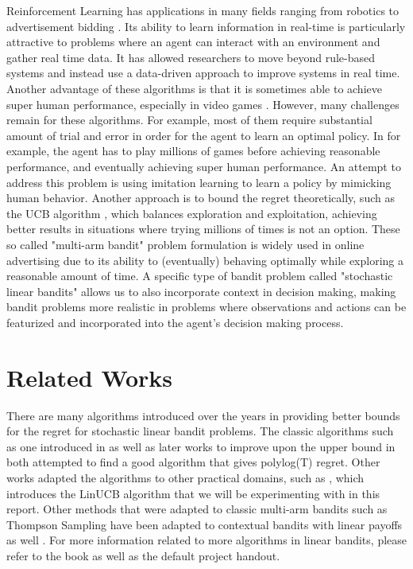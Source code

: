 \documentclass{article}
\begin{document}
Reinforcement Learning has applications in many fields ranging from robotics \cite{peters2003reinforcement} to advertisement bidding \cite{cai2017real}. Its ability to learn information in real-time is particularly attractive to problems where an agent can interact with an environment and gather real time data. It has allowed researchers to move beyond rule-based systems and instead use a data-driven approach to improve systems in real time. Another advantage of these algorithms is that it is sometimes able to achieve super human performance, especially in video games \cite{mnih2013playing}. However, many challenges remain for these algorithms. For example, most of them require substantial amount of trial and error in order for the agent to learn an optimal policy. In \citet{mnih2013playing} for example, the agent has to play millions of games before achieving reasonable performance, and eventually achieving super human performance. An attempt to address this problem is using imitation learning \cite{codevilla2018end} to learn a policy by mimicking human behavior. Another approach is to bound the regret theoretically, such as the UCB algorithm \cite{lai1985asymptotically}, which balances exploration and exploitation, achieving better results in situations where trying millions of times is not an option. These so called "multi-arm bandit" problem formulation is widely used in online advertising due to its ability to (eventually) behaving optimally while exploring a reasonable amount of time. A specific type of bandit problem called "stochastic linear bandits" \cite{abe2003reinforcement} allows us to also incorporate context in decision making, making bandit problems more realistic in problems where observations and actions can be featurized and incorporated into the agent's decision making process. 

\section{Related Works}
There are many algorithms introduced over the years in providing better bounds for the regret for stochastic linear bandit problems. The classic algorithms such as one introduced in \citet{auer2002using} as well as later works to improve upon the upper bound in \citet{dani2008stochastic} both attempted to find a good algorithm that gives polylog(T) regret. Other works adapted the algorithms to other practical domains, such as \citet{li2010contextual}, which introduces the LinUCB algorithm that we will be experimenting with in this report. Other methods that were adapted to classic multi-arm bandits such as Thompson Sampling have been adapted to contextual bandits with linear payoffs as well \cite{agrawal2013thompson}. For more information related to more algorithms in linear bandits, please refer to the book \citet{lattimore2018bandit} as well as the default project handout.
\end{document}

